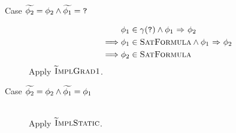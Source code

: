 \begin{proofatend}
\begin{description}
\begin{description}
            \item[Case $\widetilde{\phi_2} = \phi_2 \wedge \widetilde{\phi_1} = \textup{\texttt{?}}$]
            \begin{align*}
            &\phi_1 \in \gamma(\textup{\texttt{?}}) \wedge {\phi_1} \,\,{\Rightarrow}\,\, {\phi_2}\\
            \implies
            &\phi_1 \in \textup{\textsc{SatFormula}} \wedge {\phi_1} \,\,{\Rightarrow}\,\, {\phi_2}\\
            \implies
            &\phi_2 \in \textup{\textsc{SatFormula}}
            \end{align*}
            Apply $\textup{\textsc{\ensuremath{\widetilde{\text{I}}}mplGrad1}}$.
            
            \item[Case $\widetilde{\phi_2} = \phi_2 \wedge \widetilde{\phi_1} = \phi_1$]~\\
            Apply $\textup{\textsc{\ensuremath{\widetilde{\text{I}}}mplStatic}}$.
        \end{description}
    \end{description}
\end{proofatend}


